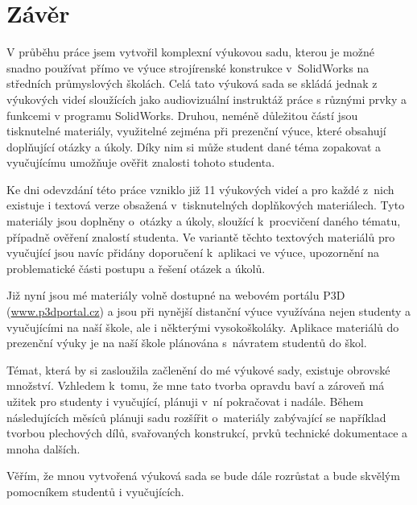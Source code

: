 \chapter*{Závěr}
V průběhu práce jsem vytvořil komplexní výukovou sadu, kterou je možné snadno používat přímo ve výuce strojírenské konstrukce v~SolidWorks na středních průmyslových školách.
Celá tato výuková sada se skládá jednak z výukových videí sloužících jako audiovizuální instruktáž práce s různými prvky a funkcemi v programu SolidWorks.
Druhou, neméně důležitou částí jsou tisknutelné materiály, využitelné zejména při prezenční výuce, které obsahují doplňující otázky a úkoly.
Díky nim si může student dané téma zopakovat a vyučujícímu umožňuje ověřit znalosti tohoto studenta. 

Ke dni odevzdání této práce vzniklo již 11 výukových videí a pro každé z~nich existuje i textová verze obsažená v~tisknutelných doplňkových materiálech.
Tyto materiály jsou doplněny o~otázky a úkoly, sloužící k~procvičení daného tématu, případně ověření znalostí studenta.
Ve variantě těchto textových materiálů pro vyučující jsou navíc přidány doporučení k~aplikaci ve výuce, upozornění na problematické části postupu a řešení otázek a úkolů.

Již nyní jsou mé materiály volně dostupné na webovém portálu P3D (\href{https://www.p3dportal.cz}{www.p3dportal.cz}) a jsou při nynější distanční výuce využívána nejen studenty a vyučujícími na naší škole, ale i některými vysokoškoláky.
Aplikace materiálů do prezenční výuky je na naší škole plánována s~návratem studentů do škol.

Témat, která by si zasloužila začlenění do mé výukové sady, existuje obrovské množství.
Vzhledem k~tomu, že mne tato tvorba opravdu baví a zároveň má užitek pro studenty i vyučující, plánuji v~ní pokračovat i nadále.
Během následujících měsíců plánuji sadu rozšířit o~materiály zabývající se například tvorbou plechových dílů, svařovaných konstrukcí, prvků technické dokumentace a mnoha dalších.

Věřím, že mnou vytvořená výuková sada se bude dále rozrůstat a bude skvělým pomocníkem studentů i vyučujících.
\newpage